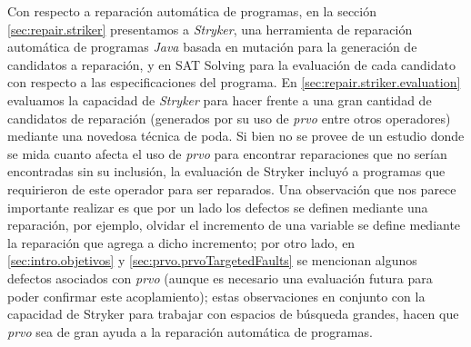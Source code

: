 Con respecto a reparaci\'on autom\'atica de programas, en la secci\'on \ref{sec:repair.striker} presentamos a \emph{Stryker}, una herramienta de reparaci\'on autom\'atica de programas \emph{Java} basada en mutaci\'on para la generaci\'on de candidatos a reparaci\'on, y en SAT Solving para la evaluaci\'on de cada candidato con respecto a las especificaciones del programa. En \ref{sec:repair.striker.evaluation} evaluamos la capacidad de \emph{Stryker} para hacer frente a una gran cantidad de candidatos de reparaci\'on (generados por su uso de \emph{prvo} entre otros operadores) mediante una novedosa t\'ecnica de poda. Si bien no se provee de un estudio donde se mida cuanto afecta el uso de \emph{prvo} para encontrar reparaciones que no ser\'ian encontradas sin su inclusi\'on, la evaluaci\'on de Stryker incluy\'o a programas que requirieron de este operador para ser reparados. Una observaci\'on que nos parece importante realizar es que por un lado los defectos se definen mediante una reparaci\'on, por ejemplo, olvidar el incremento de una variable se define mediante la reparaci\'on que agrega a dicho incremento; por otro lado, en \ref{sec:intro.objetivos} y \ref{sec:prvo.prvoTargetedFaults} se mencionan algunos defectos asociados con \emph{prvo} (aunque es necesario una evaluaci\'on futura para poder confirmar este acoplamiento); estas observaciones en conjunto con la capacidad de Stryker para trabajar con espacios de b\'usqueda grandes, hacen que \emph{prvo} sea de gran ayuda a la reparaci\'on autom\'atica de programas.